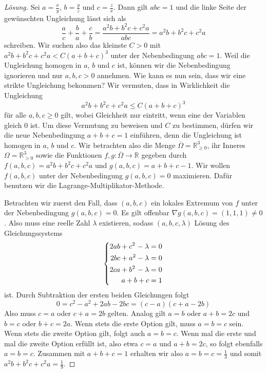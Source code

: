 \begin{proof}[Lösung]
	Sei $a=\frac xy$, $b=\frac yz$ und $c=\frac zx$. Dann gilt $abc=1$ und die linke Seite der gewünschten Ungleichung lässt sich als
	\begin{equation*}
		\frac{a}{c}+\frac{b}{a}+\frac{c}{b}=\frac{a^2b+b^2c+c^2a}{abc}=a^2b+b^2c+c^2a
	\end{equation*}
	schreiben. Wir suchen also das kleinste $C>0$ mit $a^2b+b^2c+c^2a<C(a+b+c)^3$ unter der Nebenbedingung $abc=1$. Weil die Ungleichung homogen in $a$, $b$ und $c$ ist, können wir die Nebenbedingung ignorieren und nur $a,b,c>0$ annehmen. Wie kann es nun sein, dass wir eine strikte Ungleichung bekommen? Wir vermuten, dass in Wirklichkeit die Ungleichung
	\begin{equation*}
		a^2b+b^2c+c^2a\leqslant C(a+b+c)^3
	\end{equation*}
	für alle $a,b,c\geqslant 0$ gilt, wobei Gleichheit nur eintritt, wenn eine der Variablen gleich $0$ ist. Um diese Vermutung zu beweisen und $C$ zu bestimmen, dürfen wir die neue Nebenbedingung $a+b+c=1$ einführen, denn die Ungleichung ist homogen in $a$, $b$ und $c$. Wir betrachten also die Menge $\overline{\Omega}=\mathbb R_{\geqslant 0}^3$, ihr Inneres $\Omega=\mathbb R_{>0}^3$ sowie die Funktionen $f,g\colon \overline{\Omega}\rightarrow \mathbb R$ gegeben durch $f(a,b,c)=a^2b+b^2c+c^2a$ und $g(a,b,c)=a+b+c-1$. Wir wollen $f(a,b,c)$ unter der Nebenbedingung $g(a,b,c)=0$ maximieren. Dafür benutzen wir die Lagrange-Multiplikator-Methode.
	
	Betrachten wir zuerst den Fall, dass $(a,b,c)$ ein lokales Extremum von $f$ unter der Nebenbedingung $g(a,b,c)=0$. Es gilt offenbar $\nabla g(a,b,c)=(1,1,1)\neq 0$.  Also muss eine reelle Zahl $\lambda$ existieren, sodass $(a,b,c,\lambda)$ Lösung des Gleichungssystems
	\begin{equation*}
		\left\{\begin{alignedat}{3}
			2ab&+c^2&&-\lambda&&=0\\
			2bc&+a^2&&-\lambda&&=0\\
			2ca&+b^2&&-\lambda&&=0\\
			&&&&\llap{$a+b+c$}&=1
		\end{alignedat}\right.
	\end{equation*}
	ist. Durch Subtraktion der ersten beiden Gleichungen folgt
	\begin{equation*}
		0=c^2-a^2+2ab-2bc=(c-a)(c+a-2b)
	\end{equation*}
	Also muss $c=a$ oder $c+a=2b$ gelten. Analog gilt $a=b$ oder $a+b=2c$ und $b=c$ oder $b+c=2a$. Wenn stets die erste Option gilt, muss $a=b=c$ sein. Wenn stets die zweite Option gilt, folgt auch $a=b=c$. Wenn mal die erste und mal die zweite Option erfüllt ist, also etwa $c=a$ und $a+b=2c$, so folgt ebenfalls $a=b=c$. Zusammen mit $a+b+c=1$ erhalten wir also $a=b=c=\frac13$ und somit $a^2b+b^2c+c^2a=\frac19$.
	

\end{proof}
